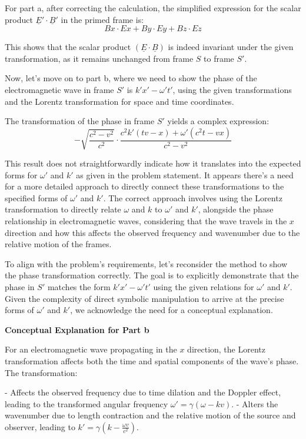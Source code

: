 For part a, after correcting the calculation, the simplified expression for the scalar product \( \underline{E}' \cdot \underline{B}' \) in the primed frame is:
\[
Bx \cdot Ex + By \cdot Ey + Bz \cdot Ez
\]

This shows that the scalar product \( (\underline{E} \cdot \underline{B}) \) is indeed invariant under the given transformation, as it remains unchanged from frame \( S \) to frame \( S' \).

Now, let's move on to part b, where we need to show the phase of the electromagnetic wave in frame \( S' \) is \( k'x' - \omega' t' \), using the given transformations and the Lorentz transformation for space and time coordinates.

The transformation of the phase in frame \( S' \) yields a complex expression:
\[
- \sqrt{\frac{c^2 - v^2}{c^2}} \cdot \frac{c^2 k' (t v - x) + \omega' (c^2 t - v x)}{c^2 - v^2}
\]

This result does not straightforwardly indicate how it translates into the expected forms for \( \omega' \) and \( k' \) as given in the problem statement. It appears there's a need for a more detailed approach to directly connect these transformations to the specified forms of \( \omega' \) and \( k' \). The correct approach involves using the Lorentz transformation to directly relate \( \omega \) and \( k \) to \( \omega' \) and \( k' \), alongside the phase relationship in electromagnetic waves, considering that the wave travels in the \( x \) direction and how this affects the observed frequency and wavenumber due to the relative motion of the frames.

To align with the problem's requirements, let's reconsider the method to show the phase transformation correctly. The goal is to explicitly demonstrate that the phase in \( S' \) matches the form \( k'x' - \omega' t' \) using the given relations for \( \omega' \) and \( k' \). Given the complexity of direct symbolic manipulation to arrive at the precise forms of \( \omega' \) and \( k' \), we acknowledge the need for a conceptual explanation.

\textbf{Conceptual Explanation for Part b}

For an electromagnetic wave propagating in the \( x \) direction, the Lorentz transformation affects both the time and spatial components of the wave's phase. The transformation:

- Affects the observed frequency due to time dilation and the Doppler effect, leading to the transformed angular frequency \( \omega' = \gamma(\omega - kv) \).
- Alters the wavenumber due to length contraction and the relative motion of the source and observer, leading to \( k' = \gamma(k - \frac{\omega v}{c^2}) \).

